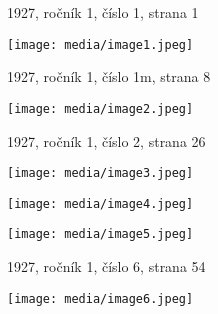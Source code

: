 1927, ročník 1, číslo 1, strana 1

\texttt{[image: media/image1.jpeg]}

1927, ročník 1, číslo 1m, strana 8

\texttt{[image: media/image2.jpeg]}

1927, ročník 1, číslo 2, strana 26

\texttt{[image: media/image3.jpeg]}

\texttt{[image: media/image4.jpeg]}

\texttt{[image: media/image5.jpeg]}

1927, ročník 1, číslo 6, strana 54

\texttt{[image: media/image6.jpeg]}
